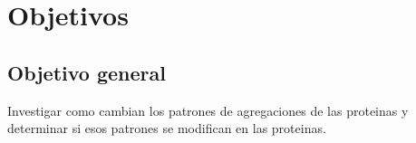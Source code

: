 \documentclass[11pt]{article}
\begin{document}

\clearpage

\section{Objetivos}
\subsection{Objetivo general}

Investigar como cambian los patrones de agregaciones de las proteinas y determinar si esos patrones se modifican en las proteinas.
\end{document}
